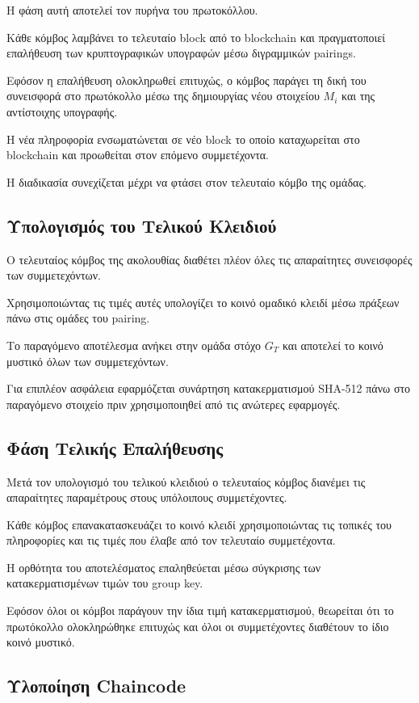 \documentclass[12pt,a4paper]{report}
\begin{document}
Η φάση αυτή αποτελεί τον πυρήνα του πρωτοκόλλου.

Κάθε κόμβος λαμβάνει το τελευταίο block από το blockchain και
πραγματοποιεί επαλήθευση των κρυπτογραφικών υπογραφών μέσω
διγραμμικών pairings.

Εφόσον η επαλήθευση ολοκληρωθεί επιτυχώς, ο κόμβος παράγει τη δική
του συνεισφορά στο πρωτόκολλο μέσω της δημιουργίας νέου στοιχείου
$M_i$ και της αντίστοιχης υπογραφής.

Η νέα πληροφορία ενσωματώνεται σε νέο block το οποίο
καταχωρείται στο blockchain και προωθείται στον επόμενο
συμμετέχοντα.

Η διαδικασία συνεχίζεται μέχρι να φτάσει στον τελευταίο κόμβο της
ομάδας.
\subsection{Υπολογισμός του Τελικού Κλειδιού}

Ο τελευταίος κόμβος της ακολουθίας διαθέτει πλέον όλες τις
απαραίτητες συνεισφορές των συμμετεχόντων.

Χρησιμοποιώντας τις τιμές αυτές υπολογίζει το κοινό ομαδικό
κλειδί μέσω πράξεων πάνω στις ομάδες του pairing.

Το παραγόμενο αποτέλεσμα ανήκει στην ομάδα στόχο $G_T$ και
αποτελεί το κοινό μυστικό όλων των συμμετεχόντων.

Για επιπλέον ασφάλεια εφαρμόζεται συνάρτηση κατακερματισμού
SHA-512 πάνω στο παραγόμενο στοιχείο πριν χρησιμοποιηθεί από τις
ανώτερες εφαρμογές.
\subsection{Φάση Τελικής Επαλήθευσης}

Μετά τον υπολογισμό του τελικού κλειδιού ο τελευταίος κόμβος
διανέμει τις απαραίτητες παραμέτρους στους υπόλοιπους
συμμετέχοντες.

Κάθε κόμβος επανακατασκευάζει το κοινό κλειδί χρησιμοποιώντας τις
τοπικές του πληροφορίες και τις τιμές που έλαβε από τον τελευταίο
συμμετέχοντα.

Η ορθότητα του αποτελέσματος επαληθεύεται μέσω σύγκρισης των
κατακερματισμένων τιμών του group key.

Εφόσον όλοι οι κόμβοι παράγουν την ίδια τιμή κατακερματισμού,
θεωρείται ότι το πρωτόκολλο ολοκληρώθηκε επιτυχώς και όλοι οι
συμμετέχοντες διαθέτουν το ίδιο κοινό μυστικό.

\subsection{Υλοποίηση Chaincode}
\end{document}

